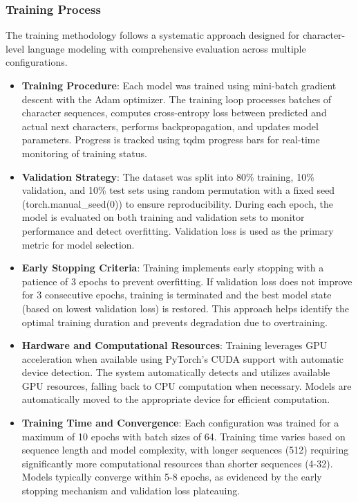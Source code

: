 \documentclass[12pt]{article}
\begin{document}
\subsubsection{Training Process}
The training methodology follows a systematic approach designed for character-level language modeling with comprehensive evaluation across multiple configurations.

\begin{itemize}
    \item \textbf{Training Procedure}: Each model was trained using mini-batch gradient descent with the Adam optimizer. The training loop processes batches of character sequences, computes cross-entropy loss between predicted and actual next characters, performs backpropagation, and updates model parameters. Progress is tracked using tqdm progress bars for real-time monitoring of training status.
    
    \item \textbf{Validation Strategy}: The dataset was split into 80\% training, 10\% validation, and 10\% test sets using random permutation with a fixed seed (torch.manual\_seed(0)) to ensure reproducibility. During each epoch, the model is evaluated on both training and validation sets to monitor performance and detect overfitting. Validation loss is used as the primary metric for model selection.
    
    \item \textbf{Early Stopping Criteria}: Training implements early stopping with a patience of 3 epochs to prevent overfitting. If validation loss does not improve for 3 consecutive epochs, training is terminated and the best model state (based on lowest validation loss) is restored. This approach helps identify the optimal training duration and prevents degradation due to overtraining.
    
    \item \textbf{Hardware and Computational Resources}: Training leverages GPU acceleration when available using PyTorch's CUDA support with automatic device detection. The system automatically detects and utilizes available GPU resources, falling back to CPU computation when necessary. Models are automatically moved to the appropriate device for efficient computation.
    
    \item \textbf{Training Time and Convergence}: Each configuration was trained for a maximum of 10 epochs with batch sizes of 64. Training time varies based on sequence length and model complexity, with longer sequences (512) requiring significantly more computational resources than shorter sequences (4-32). Models typically converge within 5-8 epochs, as evidenced by the early stopping mechanism and validation loss plateauing.
\end{itemize}
\end{document}
